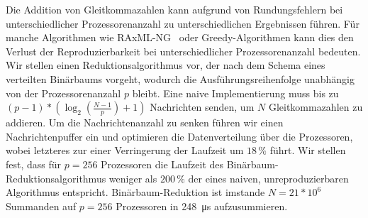 
\Abstract
Die Addition von Gleitkommazahlen kann aufgrund von Rundungsfehlern bei unterschiedlicher Prozessorenanzahl zu unterschiedlichen Ergebnissen führen.
Für manche Algorithmen wie RAxML-NG~\cite{kozlov_raxml-ng_2019} oder Greedy-Algorithmen kann dies den Verlust der Reproduzierbarkeit bei unterschiedlicher Prozessorenanzahl bedeuten.
Wir stellen einen Reduktionsalgorithmus vor, der nach dem Schema eines verteilten Binärbaums vorgeht, wodurch die Ausführungsreihenfolge unabhängig von der Prozessorenanzahl $p$ bleibt.
Eine naive Implementierung muss bis zu $(p - 1) * (\log_2 (\tfrac{N-1}{p}) + 1)$ Nachrichten senden, um $N$ Gleitkommazahlen zu addieren.
Um die Nachrichtenanzahl zu senken führen wir einen Nachrichtenpuffer ein und optimieren die Datenverteilung über die Prozessoren, wobei letzteres zur einer Verringerung der Laufzeit um $18\,\%$ führt.
Wir stellen fest, dass für $p=256$ Prozessoren die Laufzeit des Binärbaum-Reduktionsalgorithmus weniger als $200\,\%$ der eines naiven, unreproduzierbaren Algorithmus entspricht.
Binärbaum-Reduktion ist imstande $N=21*10^6$ Summanden auf $p=256$ Prozessoren in \SI{248}{\micro\second} aufzusummieren.
